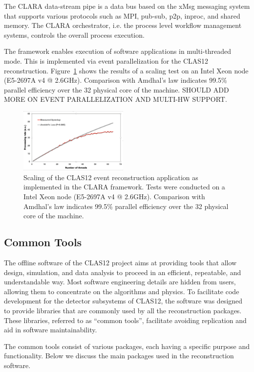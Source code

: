 The CLARA data-stream pipe is a data bus based on the xMsg messaging system that supports various protocols such as MPI, pub-sub, p2p, inproc, and shared memory. The CLARA orchestrator, i.e. the process level workflow management systems, controls the overall process execution. 

The framework enables execution of software applications in multi-threaded mode. This is implemented via event parallelization for the CLAS12 reconstruction. Figure~\ref{fig:scaling} shows the results of a scaling test on an Intel Xeon node (E5-2697A v4 @ 2.6GHz). Comparison with Amdhal's law indicates 99.5\% parallel efficiency over the 32 physical core of the machine.
{\color{red} SHOULD ADD MORE ON EVENT PARALLELIZATION AND MULTI-HW SUPPORT.}
\begin{figure}
\centering
\includegraphics[width=0.48\textwidth]{pics/scaling.png}
\caption{Scaling of the CLAS12 event reconstruction application as implemented in the CLARA framework. Tests were conducted on a Intel Xeon node (E5-2697A v4 @ 2.6GHz). Comparison with Amdhal's law indicates 99.5\% parallel efficiency over the 32 physical core of the machine.}
\label{fig:scaling}
\end{figure}

\subsection{Common Tools}
\label{common-tools}

The offline software of the CLAS12 project aims at providing tools that allow design, simulation, and data analysis to proceed in an efficient, repeatable, and understandable way. Most  software engineering details are hidden from users, allowing them to concentrate on the algorithms and physics.  To facilitate code development for the detector subsystems of CLAS12, the software was designed to provide libraries that are commonly used by all the reconstruction packages.  These libraries, referred to as ``common tools'', facilitate avoiding replication and aid in software maintainability.

The common tools consist of various packages, each having a specific purpose and functionality. Below we discuss
the main packages used in the reconstruction software.

